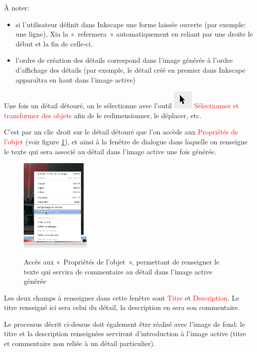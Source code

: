 \documentclass[a4paper,12pt]{report}
\newcommand{\chemin}[1]{\textcolor{red}{#1}}
\begin{document}
À noter:
\begin{itemize}
 \item si l'utilisateur définit dans Inkscape une forme laissée ouverte (par exemple: une ligne),
Xia la «~refermera~» automatiquement en reliant par une droite le début et la fin de celle-ci.
 \item l'ordre de création des détails correspond dans l'image générée à l'ordre d'affichage des détails
 (par exemple, le détail créé en premier dans Inkscape apparaîtra en haut dans l'image active)
\end{itemize}

Une fois un détail détouré, on le sélectionne avec l'outil \includegraphics[scale=0.5]{./images/selection}
\chemin{Sélectionner et transformer des objets} afin de le redimensionner, le déplacer, etc.

C'est par un clic droit sur le détail détouré que l'on accède aux \chemin{Propriétés de l'objet} (voir figure \ref{proprietes_objet}),
et ainsi à la fenêtre de dialogue dans laquelle on renseigne le texte qui sera associé au détail dans l'image active
une fois générée.

\begin{figure}[htp]
 \centering
 \caption{Accès aux «~Propriétés de l'objet~», permettant de renseigner le texte 
 qui servira de commentaire au détail dans l'image active générée}
 \includegraphics[width=0.3\textwidth]{./images/proprietes_objet}
 \label{proprietes_objet}
\end{figure}

Les deux champs à renseigner dans cette fenêtre sont \chemin{Titre} et \chemin{Description}.
Le titre renseigné ici sera celui du détail, la description en sera son commentaire.

Le processus décrit ci-dessus doit également être réalisé avec l'image de fond: le titre et la description renseignées
serviront d'introduction à l'image active (titre et commentaire non reliée à un détail particulier).
\end{document}
